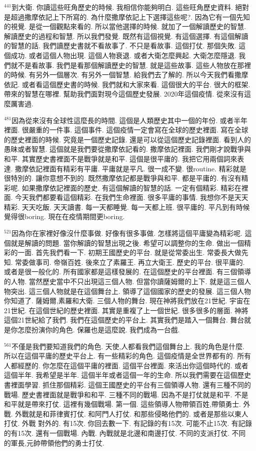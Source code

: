 \documentclass{book}
\begin{document}
$^{441}$到大衛.
你讀這些旺角歷史的時候.
我相信你能夠明白.
這些旺角歷史資料.
絕對是超過撒摩依記上下所寫的.
為什麼撒摩依記上下選擇這些呢?.
因為它有一個先知的視覺.
是從一個觀點來看的.
所以當他選擇的時候.
就加了一個解讀歷史的智慧.
解讀歷史的過程和智慧.
所以我們發覺.
既然有這個視覺.
有這個選擇.
有這個解讀的智慧的話.
我們讀歷史書就不看故事了.
不只是看故事.
這個打仗.
那個失敗.
這個成功.
或者這個人物出現.
這個人物衰退.
或者大衛怎麼興起.
大衛怎麼隱退.
我們就不是看故事.
我們是看那個解讀歷史的智慧.
就是這些故事.
這些人物放在那裡的時候.
有另外一個層次.
有另外一個智慧.
給我們去了解的.
所以今天我們看撒摩依記.
或者看這個歷史書的時候.
我們就和大家來看.
這個很大的平台.
很大的框架.
帶來的智慧在哪裡.
幫助我們面對現今這個歷史發展.
2020年這個疫情.
從來沒有這麼厲害過.

$^{481}$因為從來沒有全球性這麼長的時間.
這個是人類歷史其中一個的年份.
或者半年裡面.
很嚴重的一件事.
這個事件.
這個疫情一定會寫在全球的歷史裡面.
寫在全球的歷史裡面的時候.
究竟是一個歷史記錄.
還是可以從這個歷史記錄裡面.
看到人的愚昧或者智慧.
這個就是我們要從撒摩依記看的.
撒摩依記裡面.
我們剛才說戰爭與和平.
其實歷史書裡面不是戰爭就是和平.
這個是很平庸的.
我把它用兩個詞來表達.
撒摩依記裡面有精彩有平庸.
平庸就是平凡.
很一成不變.
很routine.
精彩就是很特別的.
讓你意想不到的.
既然撒摩依記都是戰爭與和平.
都是平庸的.
有沒有精彩呢.
如果撒摩依記裡面的歷史.
有這個解讀的智慧的話.
一定有個精彩.
精彩在裡面.
今天我們都要看這個精彩.
在我們生命裡面.
很多平庸的事情.
我想你不是天天精彩.
天天吃飯.
天天讀書.
每一天都睡覺.
每一天都上班.
很平庸的.
平凡到有時候覺得很boring.
現在在疫情期間更boring.

$^{521}$因為你在家裡好像沒什麼事做.
好像有很多事做.
怎樣將這個平庸變為精彩呢.
這個就是解讀的問題.
當你解讀的智慧出現之後.
希望可以調整你的生命.
做出一個精彩的一面.
首先我們看一下.
初期王國歷史的平台.
就是從常委出生.
常委長大做先知.
常委做事司.
帝嶺百姓.
後來立了素羅王.
再立大衛王.
歷史的平台.
很平庸的.
或者是很一般化的.
所有國家都是這樣發展的.
在這個歷史的平台裡面.
有三個領導的人物.
當然歷史當中不只出現這三個人物.
但當你讀薩姆爾的上下.
就是這三個人物突出.
這三個人物就是在這個舞台上.
領導了這個國家的歷史的發展.
這三個人物你知道了.
薩姆爾,素羅和大衛.
三個人物的舞台.
現在神將我們放在21世紀.
宇宙在21世紀.
在這個世紀的歷史裡面.
其實是重複了上一個世紀.
很多很多的層面.
神將這個21世紀給了我們.
我們在這個歷史的平台上.
其實我們是踏入一個舞台.
舞台就是你怎麼扮演你的角色.
保羅也是這麼說.
我們成為一台戲.

$^{561}$不僅是我們要知道我們的角色.
天使,人都看我們這個舞台上.
我的角色是什麼.
所以在這個平庸的歷史平台上.
有一些精彩的角色.
這個疫情是全世界都有的.
所有人都經歷的.
你怎麼在這個平庸的裡面.
這個平台裡面.
來活出你這個時代的.
或者這個半年.
我希望是半年.
這個半年或者這個一年的生命.
所以我們需要在這個歷史書裡面學習.
抓住那個精彩.
這個王國歷史的平台有三個領導人物.
還有三種不同的戰場.
歷史書裡面就是戰爭和和平.
三種不同的戰場.
因為不是打仗就是和平.
不是和平就是帶來打仗.
這裡有幾個戰場.
第一個.
這些領導人物帶領百姓,帶領勇士.
外戰.
外戰就是和菲律賓打仗.
和阿門人打仗.
和那些侵略他們的.
或者是那些以東人打仗.
外戰 對外的.
有15次.
你回去數一下.
有記錄的有15次.
可能不止15次.
有記錄的有15次.
還有一個戰場.
內戰.
內戰就是北邊和南邊打仗.
不同的支派打仗.
不同的軍長,元帥帶領他們的勇士打仗.
\end{document}
